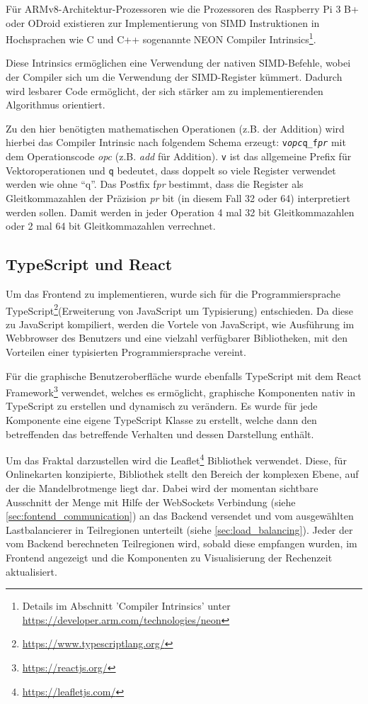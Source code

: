 Für ARMv8-Architektur-Prozessoren wie die Prozessoren des Raspberry Pi 3 B+ oder ODroid
existieren zur Implementierung von SIMD Instruktionen in Hochsprachen wie C und C++ sogenannte
NEON Compiler Intrinsics\footnote{Details im Abschnitt 'Compiler Intrinsics' unter \url{https://developer.arm.com/technologies/neon}}.

Diese Intrinsics ermöglichen eine Verwendung der nativen SIMD-Befehle, wobei der Compiler sich um die Verwendung der SIMD-Register kümmert.
Dadurch wird lesbarer Code ermöglicht, der sich stärker am zu implementierenden Algorithmus orientiert.

Zu den hier benötigten mathematischen Operationen (z.B. der Addition) wird hierbei das Compiler Intrinsic nach folgendem Schema erzeugt:
\texttt{v\textit{opc}q\_f\textit{pr}} mit dem Operationscode \textit{opc} (z.B. \textit{add} für Addition).
\verb|v| ist das allgemeine Prefix für Vektoroperationen und \verb|q| bedeutet, dass doppelt so viele Register verwendet werden wie ohne \enquote{q}.
Das Postfix f\textit{pr} bestimmt, dass die Register als Gleitkommazahlen der Präzision \textit{pr} bit (in diesem Fall 32 oder 64) interpretiert werden sollen.
Damit werden in jeder Operation 4 mal 32 bit Gleitkommazahlen oder 2 mal 64 bit Gleitkommazahlen verrechnet.


\subsection{TypeScript und React}
Um das Frontend zu implementieren, wurde sich für die Programmiersprache TypeScript\footnote{\url{https://www.typescriptlang.org/}}(Erweiterung von JavaScript um Typisierung) entschieden.
Da diese zu JavaScript kompiliert, werden die Vortele von JavaScript, wie Ausführung im Webbrowser des Benutzers und eine vielzahl verfügbarer Bibliotheken,
mit den Vorteilen einer typisierten Programmiersprache vereint.


Für die graphische Benutzeroberfläche wurde ebenfalls TypeScript mit dem React Framework\footnote{\url{https://reactjs.org/}} verwendet, welches es ermöglicht,
graphische Komponenten nativ in TypeScript zu erstellen und dynamisch zu verändern.
Es wurde für jede Komponente eine eigene TypeScript Klasse zu erstellt, welche dann den betreffenden
das betreffende Verhalten und dessen Darstellung enthält.


Um das Fraktal darzustellen wird die Leaflet\footnote{\url{https://leafletjs.com/}} Bibliothek verwendet.
Diese, für Onlinekarten konzipierte, Bibliothek stellt den Bereich der komplexen Ebene, auf der die Mandelbrotmenge liegt dar.
Dabei wird der momentan sichtbare Ausschnitt der Menge mit Hilfe der WebSockets Verbindung (siehe \autoref{sec:fontend_communication}) an das Backend versendet und vom ausgewählten Lastbalancierer in Teilregionen unterteilt (siehe \autoref{sec:load_balancing}).
Jeder der vom Backend berechneten Teilregionen wird, sobald diese empfangen wurden, im Frontend angezeigt und die Komponenten
zu Visualisierung der Rechenzeit aktualisiert.
